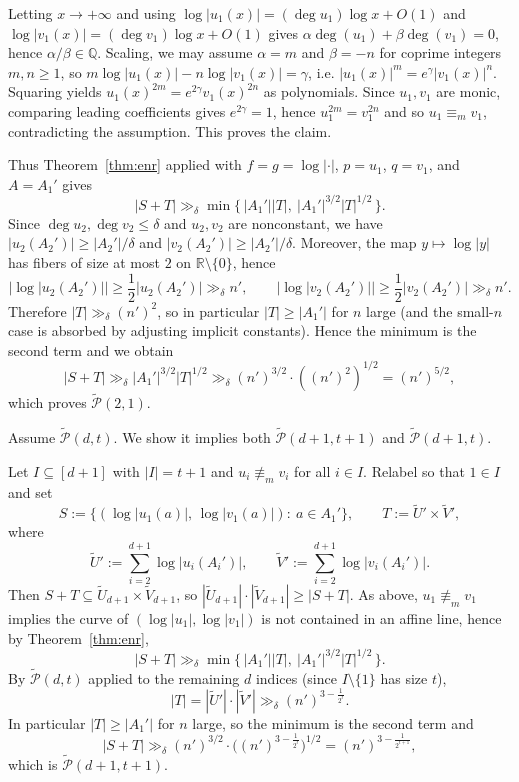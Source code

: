 \documentclass[12pt,reqno]{amsart}
\numberwithin{equation}{section}
\begin{document}
Letting $x\to+\infty$ and using
$\log|u_1(x)|=(\deg u_1)\log x+O(1)$ and
$\log|v_1(x)|=(\deg v_1)\log x+O(1)$ gives
$\alpha\deg(u_1)+\beta\deg(v_1)=0$, hence $\alpha/\beta\in\mathbb Q$.
Scaling, we may assume $\alpha=m$ and $\beta=-n$ for coprime integers $m,n\ge 1$, so
$m\log|u_1(x)|-n\log|v_1(x)|=\gamma$, i.e.
$|u_1(x)|^m=e^{\gamma}|v_1(x)|^n$.
Squaring yields $u_1(x)^{2m}=e^{2\gamma}v_1(x)^{2n}$ as polynomials.
Since $u_1,v_1$ are monic, comparing leading coefficients gives $e^{2\gamma}=1$, hence $u_1^{2m}=v_1^{2n}$ and so
$u_1\equiv_m v_1$, contradicting the assumption.
This proves the claim.


Thus Theorem~\ref{thm:enr} applied with $f=g=\log|\cdot|$, $p=u_1$, $q=v_1$, and $A=A_1'$ gives
\[
|S+T|\gg_\delta \min\{\,|A_1'||T|,\ |A_1'|^{3/2}|T|^{1/2}\,\}.
\]
Since $\deg u_2,\deg v_2\le\delta$ and $u_2,v_2$ are nonconstant, we have
$|u_2(A_2')|\ge |A_2'|/\delta$ and $|v_2(A_2')|\ge |A_2'|/\delta$.
Moreover, the map $y\mapsto \log|y|$ has fibers of size at most $2$ on $\mathbb R\setminus\{0\}$, hence
\[
|\log|u_2(A_2')||\ge \frac12|u_2(A_2')|\gg_\delta n',
\qquad
|\log|v_2(A_2')||\ge \frac12|v_2(A_2')|\gg_\delta n'.
\]
Therefore $|T|\gg_\delta (n')^2$, so in particular $|T|\ge |A_1'|$ for $n$ large (and the small-$n$ case is absorbed
by adjusting implicit constants). Hence the minimum is the second term and we obtain
\[
|S+T|\gg_\delta |A_1'|^{3/2}|T|^{1/2}\gg_\delta (n')^{3/2}\cdot((n')^2)^{1/2}=(n')^{5/2},
\]
which proves $\widetilde{\mathcal P}(2,1)$.

\smallskip
{}
Assume $\widetilde{\mathcal P}(d,t)$. We show it implies both
$\widetilde{\mathcal P}(d+1,t+1)$ and $\widetilde{\mathcal P}(d+1,t)$.

\smallskip
{}
Let $I\subseteq[d+1]$ with $|I|=t+1$ and $u_i\not\equiv_m v_i$ for all $i\in I$.
Relabel so that $1\in I$ and set
\[
S:=\{(\log|u_1(a)|,\,\log|v_1(a)|):\ a\in A_1'\},\qquad
T:=\widetilde U'\times \widetilde V',
\]
where
\[
\widetilde U':=\sum_{i=2}^{d+1}\log|u_i(A_i')|,
\qquad
\widetilde V':=\sum_{i=2}^{d+1}\log|v_i(A_i')|.
\]
Then $S+T\subseteq \widetilde U_{d+1}\times\widetilde V_{d+1}$, so
$|\widetilde U_{d+1}|\cdot|\widetilde V_{d+1}|\ge |S+T|$.
As above, $u_1\not\equiv_m v_1$ implies the curve of $(\log|u_1|,\log|v_1|)$ is not contained in an affine line, hence by Theorem~\ref{thm:enr},
\[
|S+T|\gg_\delta \min\{\,|A_1'||T|,\ |A_1'|^{3/2}|T|^{1/2}\,\}.
\]
By $\widetilde{\mathcal P}(d,t)$ applied to the remaining $d$ indices (since $I\setminus\{1\}$ has size $t$),
\[
|T|=|\widetilde U'|\cdot|\widetilde V'|\gg_\delta (n')^{3-\frac1{2^t}}.
\]
In particular $|T|\ge |A_1'|$ for $n$ large, so the minimum is the second term and
\[
|S+T|\gg_\delta (n')^{3/2}\cdot \Big((n')^{3-\frac1{2^t}}\Big)^{1/2}
=(n')^{3-\frac1{2^{t+1}}},
\]
which is $\widetilde{\mathcal P}(d+1,t+1)$.
\end{document}
